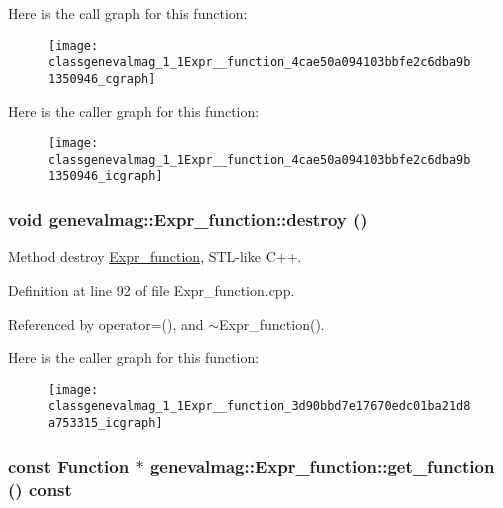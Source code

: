 Here is the call graph for this function:\nopagebreak
\begin{figure}[H]
\begin{center}
\leavevmode
\texttt{[image: classgenevalmag\_1\_1Expr\_\_function\_4cae50a094103bbfe2c6dba9b1350946\_cgraph]}
\end{center}
\end{figure}


Here is the caller graph for this function:\nopagebreak
\begin{figure}[H]
\begin{center}
\leavevmode
\texttt{[image: classgenevalmag\_1\_1Expr\_\_function\_4cae50a094103bbfe2c6dba9b1350946\_icgraph]}
\end{center}
\end{figure}
\hypertarget{classgenevalmag_1_1Expr__function_3d90bbd7e17670edc01ba21d8a753315}{
\subsubsection[{destroy}]{\setlength{\rightskip}{0pt plus 5cm}void genevalmag::Expr\_\-function::destroy ()}}
\label{classgenevalmag_1_1Expr__function_3d90bbd7e17670edc01ba21d8a753315}


Method destroy \hyperlink{classgenevalmag_1_1Expr__function}{Expr\_\-function}, STL-like C++. 

Definition at line 92 of file Expr\_\-function.cpp.

Referenced by operator=(), and $\sim$Expr\_\-function().

Here is the caller graph for this function:\nopagebreak
\begin{figure}[H]
\begin{center}
\leavevmode
\texttt{[image: classgenevalmag\_1\_1Expr\_\_function\_3d90bbd7e17670edc01ba21d8a753315\_icgraph]}
\end{center}
\end{figure}
\hypertarget{classgenevalmag_1_1Expr__function_7f1fedb3efc2c8eaf07877a8e72a2579}{
\subsubsection[{get\_\-function}]{\setlength{\rightskip}{0pt plus 5cm}const {\bf Function} $\ast$ genevalmag::Expr\_\-function::get\_\-function () const}}
\label{classgenevalmag_1_1Expr__function_7f1fedb3efc2c8eaf07877a8e72a2579}


